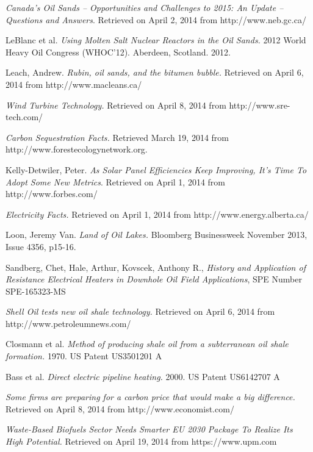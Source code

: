 \documentclass[11pt]{article}
\begin{document}
\begin{thebibliography}{9}
 \emph{Canada’s Oil Sands – Opportunities and Challenges to 2015: An Update – Questions and Answers}. Retrieved on April 2, 2014 from http://www.neb.gc.ca/ 

LeBlanc et al.  \emph{Using Molten Salt Nuclear Reactors in the Oil Sands.} 2012 World Heavy Oil Congress (WHOC’12). Aberdeen, Scotland. 2012. 

Leach, Andrew.  \emph{Rubin, oil sands, and the bitumen bubble.} Retrieved on April 6, 2014 from http://www.macleans.ca/ 

 \emph{Wind Turbine Technology.} Retrieved on April 8, 2014 from http://www.sre-tech.com/

 \emph{Carbon Sequestration Facts.} Retrieved March 19, 2014 from http://www.forestecologynetwork.org.

Kelly-Detwiler, Peter.  \emph{As Solar Panel Efficiencies Keep Improving, It's Time To Adopt Some New Metrics}. Retrieved on April 1, 2014 from http://www.forbes.com/ 

 \emph{Electricity Facts.} Retrieved on April 1, 2014 from http://www.energy.alberta.ca/ 

Loon, Jeremy Van.  \emph{ Land of Oil Lakes.} Bloomberg Businessweek November 2013, Issue 4356, p15-16.

Sandberg, Chet, Hale, Arthur, Kovscek, Anthony R.,  \emph{History and Application of Resistance Electrical Heaters in Downhole Oil Field Applications}, SPE Number SPE-165323-MS

 \emph{Shell Oil tests new oil shale technology.} Retrieved on April 6, 2014 from http://www.petroleumnews.com/ 

Closmann et al.  \emph{Method of producing shale oil from a subterranean oil shale formation.} 1970. US Patent US3501201 A

Bass et al.  \emph{Direct electric pipeline heating.} 2000. US Patent US6142707 A

 \emph{Some firms are preparing for a carbon price that would make a big difference.} Retrieved on April 8, 2014 from http://www.economist.com/

 \emph{Waste-Based Biofuels Sector Needs Smarter EU 2030 Package To Realize Its High Potential.} Retrieved on April 19, 2014 from https://www.upm.com


\end{thebibliography}
\end{document}
